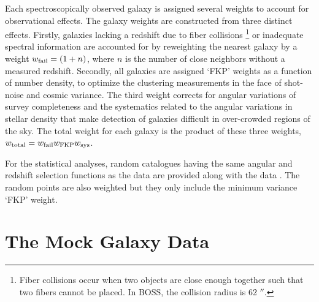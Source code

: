 \documentclass[iop]{emulateapj}
\begin{document}
Each spectroscopically observed galaxy is assigned several weights to account for observational effects. 
The galaxy weights are constructed from three distinct effects.
Firstly, galaxies lacking a redshift due to fiber collisions 
\footnote{Fiber collisions occur when two objects are close enough together such that two fibers cannot be placed.
In BOSS, the collision radius is 62 $''$.}
or inadequate spectral information are accounted for by reweighting
the nearest galaxy by a weight $w_{\rm fail}=(1+n)$, 
where $n$ is the number of close neighbors without a measured redshift. 
Secondly, all galaxies are assigned `FKP' weights \citep{1994ApJ...426...23F}
as a function of number density,
to optimize the clustering measurements in the face of shot-noise and cosmic variance.
The third weight corrects for angular variations of survey completeness and the systematics 
related to the angular variations in stellar density that make detection of
galaxies difficult in over-crowded regions of the sky. %
The total weight for each galaxy is the product of these three weights, $w_{\rm total}=w_{\rm fail}w_{\rm FKP}w_{\rm sys}$. 

For the statistical analyses, 
random catalogues having the same angular and redshift selection functions as the data 
are provided along with the data \citep{Reidetal:2016}.
The random points are also weighted but they only include the minimum variance `FKP' weight. 




\section{The Mock Galaxy Data}
\label{sec:mocks}
\end{document}
